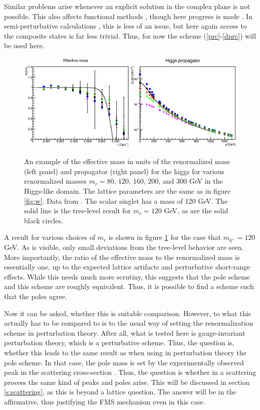 \documentclass[final,twoside,12pt]{article}
\newcommand*{\prefr}[2]{(\ref{#1}-\ref{#2})}
\newcommand*{\1}{1\!\!\!\bot}
\begin{document}
Similar problems arise whenever an explicit solution in the complex plane is not possible. This also affects functional methods \cite{Benes:2008ir,Fister:2010yw,Gies:2015lia}, though here progress is made \cite{Strauss:2012as,Pawlowski:2015mia}. In semi-perturbative calculations \cite{Capri:2012cr,Capri:2017abz}, this is less of an issue, but here again access to the composite states is far less trivial. Thus, for now the scheme \prefr{prc}{dprc} will be used here.

\begin{figure}
\includegraphics[width=\linewidth]{h}\\
\caption{\label{fig:h}An example of the effective mass in units of the renormalized mass (left panel) and propagator (right panel) for the higgs for various renormalized masses $m_r=80$, $120$, $160$, $200$, and $300$ GeV in the Higgs-like domain. The lattice parameters are the same as in figure \ref{fig:w}. Data from \cite{Maas:2013aia,Maas:unpublished}. The scalar singlet has a mass of 120 GeV. The solid line is the tree-level result for $m_r=120$ GeV, as are the solid black circles.}
\end{figure}

A result for various choices of $m_r$ is shown in figure \ref{fig:h} for the case that $m_{0^+}=120$ GeV. As is visible, only small deviations from the tree-level behavior are seen. More importantly, the ratio of the effective mass to the renormalized mass is essentially one, up to the expected lattice artifacts and perturbative short-range effects. While this needs much more scrutiny, this suggests that the pole scheme and this scheme are roughly equivalent. Thus, it is possible to find a scheme such that the poles agree.

Now it can be asked, whether this is suitable comparison. However, to what this actually has to be compared to is to the usual way of setting the renormalization scheme in perturbation theory. After all, what is tested here is gauge-invariant perturbation theory, which is a perturbative scheme. Thus, the question is, whether this leads to the same result as when using in perturbation theory the pole scheme. In that case, the pole mass is set by the experimentally observed peak in the scattering cross-section \cite{Bohm:2001yx,Einhorn:1992um}. Thus, the question is whether in a scattering process the same kind of peaks and poles arise. This will be discussed in section \ref{s:scattering}, as this is beyond a lattice question. The answer will be in the affirmative, thus justifying the FMS mechanism even in this case.
\end{document}
